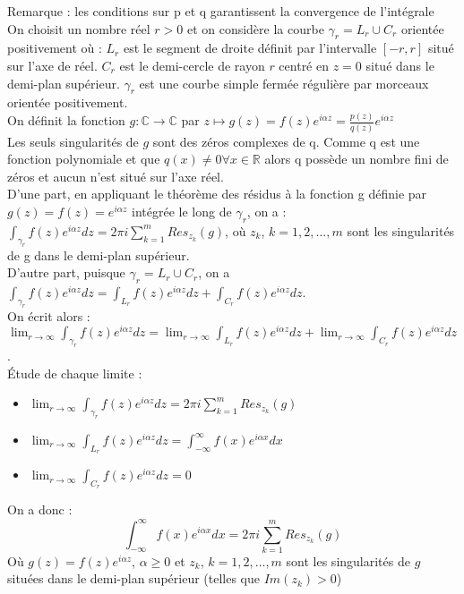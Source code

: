 \documentclass[../main.tex]{subfiles}
\begin{document}
\color{gray} Remarque : les conditions sur p et q garantissent la convergence de l'intégrale \color{black}\\

On choisit un nombre réel $r>0$ et on considère la courbe $\gamma_r = L_r \cup C_r$ orientée positivement où : $L_r$ est le segment de droite définit par l'intervalle $[-r, r]$ situé sur l'axe de réel. $C_r$ est le demi-cercle de rayon $r$ centré en $z=0$ situé dans le demi-plan supérieur. $\gamma_r$ est une courbe simple fermée régulière par morceaux orientée positivement.\\
On définit la fonction $g:\mathbb{C}\rightarrow \mathbb{C}$
 par $z\mapsto g(z) = f(z) e^{i\alpha z} = \frac{p(z)}{q(z)} e^{i\alpha z}$\\
 Les seuls singularités de $g$ sont des zéros complexes de q. Comme q est une fonction polynomiale et que $q(x)\neq 0 \forall x \in \mathbb{R}$ alors q possède un nombre fini de zéros et aucun n'est situé sur l'axe réel.\\

 D'une part, en appliquant le théorème des résidus à la fonction g définie par $g(z) = f(z)=e^{i\alpha z}$ intégrée le long de $\gamma_r$, on a : $\int_{\gamma_r} f(z)e^{i\alpha z}dz = 2\pi i \sum_{k=1}^m Res_{z_k}(g)$, où $z_k$, $k=1,2,\dots,m$ sont les singularités de g dans le demi-plan supérieur.\\
 D'autre part, puisque $\gamma_r = L_r \cup C_r$, on a $\int_{\gamma_r} f(z)e^{i\alpha z}dz = \int_{L_r} f(z)e^{i\alpha z}dz + \int_{C_r} f(z)e^{i\alpha z}dz$.\\
On écrit alors : $\lim_{r\rightarrow \infty}\int_{\gamma_r} f(z)e^{i\alpha z}dz =\lim_{r\rightarrow \infty} \int_{L_r} f(z)e^{i\alpha z}dz + \lim_{r\rightarrow \infty} \int_{C_r} f(z)e^{i\alpha z}dz$.\\
Étude de chaque limite :
\begin{itemize}
    \item $\lim_{r\rightarrow \infty}\int_{\gamma_r} f(z)e^{i\alpha z}dz = 2\pi i \sum_{k=1}^m Res_{z_k}(g)$\\
    \item $\lim_{r\rightarrow \infty} \int_{L_r} f(z)e^{i\alpha z}dz = \int_{-\infty}^\infty f(x)e^{i\alpha x}dx$\\
    \item $\lim_{r\rightarrow \infty} \int_{C_r} f(z)e^{i\alpha z}dz = 0$\\
\end{itemize}

 On a donc : \\
 \begin{equation}
     \int_{-\infty}^\infty f(x)e^{i\alpha x}dx = 2\pi i \sum_{k=1}^m Res_{z_k}(g)
 \end{equation}
 Où $g(z) = f(z) e^{i\alpha z}$, $\alpha \geq 0$ et $z_k$, $k=1,2,\dots,m$ sont les singularités de $g$ situées dans le demi-plan supérieur (telles que $Im(z_k) >0$)\\
\end{document}
